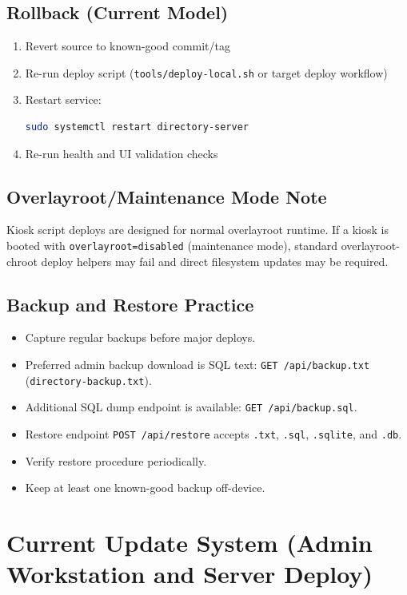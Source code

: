 \documentclass[11pt,letterpaper]{article}
\begin{document}
\subsection{Rollback (Current Model)}

\begin{enumerate}
\item Revert source to known-good commit/tag
\item Re-run deploy script (\texttt{tools/deploy-local.sh} or target deploy workflow)
\item Restart service:
\begin{lstlisting}[language=bash]
sudo systemctl restart directory-server
\end{lstlisting}
\item Re-run health and UI validation checks
\end{enumerate}

\subsection{Overlayroot/Maintenance Mode Note}

Kiosk script deploys are designed for normal overlayroot runtime.  
If a kiosk is booted with \texttt{overlayroot=disabled} (maintenance mode), standard overlayroot-chroot deploy helpers may fail and direct filesystem updates may be required.

\subsection{Backup and Restore Practice}

\begin{itemize}
\item Capture regular backups before major deploys.
\item Preferred admin backup download is SQL text: \texttt{GET /api/backup.txt} (\texttt{directory-backup.txt}).
\item Additional SQL dump endpoint is available: \texttt{GET /api/backup.sql}.
\item Restore endpoint \texttt{POST /api/restore} accepts \texttt{.txt}, \texttt{.sql}, \texttt{.sqlite}, and \texttt{.db}.
\item Verify restore procedure periodically.
\item Keep at least one known-good backup off-device.
\end{itemize}


\section{Current Update System (Admin Workstation and Server Deploy)}
\end{document}
